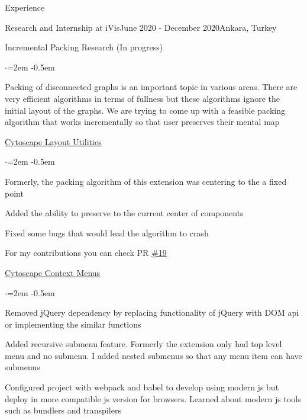 \documentclass{resume} %
\begin{document}
\begin{rSection}{Experience}
\begin{rSubsection}{Research and Internship at iVis}{June 2020 - December 2020}{}{Ankara, Turkey}
\item Incremental Packing Research (In progress)
\begin{list}{$\cdot$}{\leftmargin=2em}
\itemsep -0.5em \vspace{-0.5em} %
    \item Packing of disconnected graphs is an important topic in various areas. There are very efficient algorithms in terms of fullness but these algorithms ignore the initial layout of the graphs. We are trying to come up with a feasible packing algorithm that works incrementally so that user preserves their mental map
\end{list}
\item \href{https://github.com/iVis-at-Bilkent/cytoscape.js-layout-utilities}{Cytoscape Layout Utilities}
\begin{list}{$\cdot$}{\leftmargin=2em}
\itemsep -0.5em \vspace{-0.5em} %
    \item Formerly, the packing algorithm of this extension was centering to the a fixed point
    \item Added the ability to preserve to the current center of components
    \item Fixed some bugs that would lead the algorithm to crash
    \item For my contributions you can check PR \href{https://github.com/iVis-at-Bilkent/cytoscape.js-layout-utilities/pull/19}{\#19}
\end{list}
\item \href{https://github.com/onsah/cytoscape.js-context-menus}{Cytoscape Context Menus}
\begin{list}{$\cdot$}{\leftmargin=2em}
    \itemsep -0.5em \vspace{-0.5em} %
    \item Removed jQuery dependency by replacing functionality of jQuery with DOM api or implementing the similar functions
    \item Added recursive submenu feature. Formerly the extension only had top level menu and no submenu. I added nested submenus so that any menu item can have submenus
    \item Configured project with webpack and babel to develop using modern js but deploy in more compatible js version for browsers. Learned about modern js tools such as bundlers and transpilers
\end{list}
\end{rSubsection}

\end{rSection}
\end{document}
